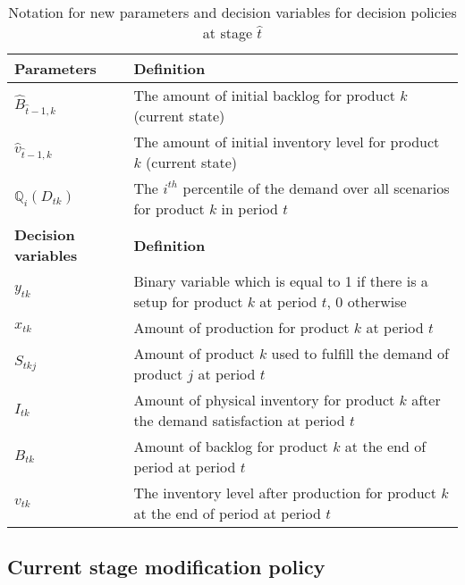 \documentclass[10pt]{article}
\newcommand{\ti}{t} %
\newcommand{\ka}{k} %
\newcommand{\jey}{j} %
\newcommand{\Bi}{B} %
\newcommand{\Vi}{v} %
\newcommand{\Es}{S} %
\newcommand{\x}{x} %
\newcommand{\y}{y} %
\newcommand{\InvPos}{inventory level after production }
\newcommand{\tAct}{\hat{\ti}} %
\begin{document}
\begin{table}[H]
\centering
\caption{Notation for new parameters and decision variables for decision policies at stage $\tAct$}
\begin{adjustbox}{width=1\textwidth,center=\textwidth}
\begin{tabular}{ll}
\toprule
{\bf Parameters} & {\bf Definition} \\ \midrule
$\hat{B}_{\tAct-1, \ka}$  & The amount of initial backlog for product $\ka$ (current state)\\
$\hat{v}_{\tAct-1, \ka}$  & The amount of initial inventory level for product $\ka$ (current state) \\
$\mathbb{Q}_{i}({D}_{\ti \ka})$& The $i^{th}$ percentile of the demand over all scenarios for product $\ka$ in period $\ti$\\
\midrule
{\bf Decision variables} & {\bf Definition} \\ \midrule
$\y_{\ti \ka}$ & Binary variable which is equal to 1 if there is a setup for product $\ka$ at period $\ti$, 0 otherwise \\ 
$\x_{\ti \ka}$ & Amount of production for product $\ka$  at period $\ti$  \\ 
$\Es_{\ti \ka \jey}$ & Amount of product $\ka$  used to fulfill the demand of product $\jey$  at period $\ti$   \\
${I}_{\ti \ka}$ & Amount of physical inventory for product $k$ after the demand satisfaction at period $\ti$   \\
${\Bi}_{\ti \ka}$ & Amount of backlog for product $k$ at the end of period at period $\ti$   \\
${\Vi}_{\ti \ka}$ & The \InvPos for product $\ka$ at the end of period at period $\ti$ \\ \bottomrule
\end{tabular}
\end{adjustbox}
 \label{tab:Sub_Policy_parameters}
\end{table}


 \subsection{Current stage modification policy}
\end{document}
